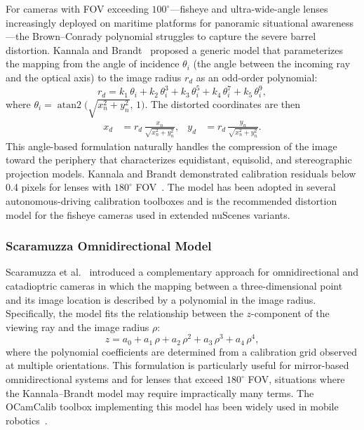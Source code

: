 For cameras with FOV exceeding $100^\circ$---fisheye and ultra-wide-angle lenses increasingly deployed on maritime platforms for panoramic situational awareness---the Brown--Conrady polynomial struggles to capture the severe barrel distortion. Kannala and Brandt~\cite{kannala2006generic} proposed a generic model that parameterizes the mapping from the angle of incidence $\theta_i$ (the angle between the incoming ray and the optical axis) to the image radius $r_d$ as an odd-order polynomial:
\begin{equation}\label{eq:kannala}
  r_d = k_1\,\theta_i + k_2\,\theta_i^3 + k_3\,\theta_i^5 + k_4\,\theta_i^7 + k_5\,\theta_i^9,
\end{equation}
where $\theta_i = \operatorname{atan2}\!\bigl(\sqrt{x_n^2 + y_n^2},\, 1\bigr)$. The distorted coordinates are then
\begin{align}
  x_d &= r_d \,\frac{x_n}{\sqrt{x_n^2 + y_n^2}}, &
  y_d &= r_d \,\frac{y_n}{\sqrt{x_n^2 + y_n^2}}.
\end{align}
This angle-based formulation naturally handles the compression of the image toward the periphery that characterizes equidistant, equisolid, and stereographic projection models. Kannala and Brandt demonstrated calibration residuals below 0.4 pixels for lenses with $180^\circ$ FOV~\cite{kannala2006generic}. The model has been adopted in several autonomous-driving calibration toolboxes and is the recommended distortion model for the fisheye cameras used in extended nuScenes variants.

\subsubsection{Scaramuzza Omnidirectional Model}

Scaramuzza et al.~\cite{scaramuzza2006toolbox} introduced a complementary approach for omnidirectional and catadioptric cameras in which the mapping between a three-dimensional point and its image location is described by a polynomial in the image radius. Specifically, the model fits the relationship between the $z$-component of the viewing ray and the image radius $\rho$:
\begin{equation}\label{eq:scaramuzza}
  z = a_0 + a_1\,\rho + a_2\,\rho^2 + a_3\,\rho^3 + a_4\,\rho^4,
\end{equation}
where the polynomial coefficients are determined from a calibration grid observed at multiple orientations. This formulation is particularly useful for mirror-based omnidirectional systems and for lenses that exceed $180^\circ$ FOV, situations where the Kannala--Brandt model may require impractically many terms. The OCamCalib toolbox implementing this model has been widely used in mobile robotics~\cite{scaramuzza2006toolbox}.

